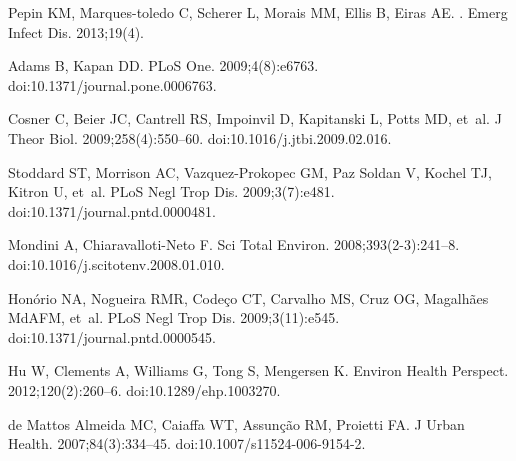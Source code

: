 \documentclass[10pt,letterpaper]{article}
\begin{document}
\begin{thebibliography}{10}
Pepin KM, Marques-toledo C, Scherer L, Morais MM, Ellis B, Eiras AE.
.
\newblock Emerg Infect Dis. 2013;19(4).

Adams B, Kapan DD.
\newblock PLoS One. 2009;4(8):e6763.
\newblock doi:{10.1371/journal.pone.0006763}.

Cosner C, Beier JC, Cantrell RS, Impoinvil D, Kapitanski L, Potts MD, et~al.
\newblock J Theor Biol. 2009;258(4):550--60.
\newblock doi:{10.1016/j.jtbi.2009.02.016}.

Stoddard ST, Morrison AC, Vazquez-Prokopec GM, {Paz Soldan} V, Kochel TJ,
  Kitron U, et~al.
\newblock PLoS Negl Trop Dis. 2009;3(7):e481.
\newblock doi:{10.1371/journal.pntd.0000481}.

Mondini A, Chiaravalloti-Neto F.
\newblock Sci Total Environ. 2008;393(2-3):241--8.
\newblock doi:{10.1016/j.scitotenv.2008.01.010}.

Hon{\'{o}}rio NA, Nogueira RMR, Code{\c{c}}o CT, Carvalho MS, Cruz OG,
  Magalh{\~{a}}es MdAFM, et~al.
\newblock PLoS Negl Trop Dis. 2009;3(11):e545.
\newblock doi:{10.1371/journal.pntd.0000545}.

Hu W, Clements A, Williams G, Tong S, Mengersen K.
\newblock Environ Health Perspect. 2012;120(2):260--6.
\newblock doi:{10.1289/ehp.1003270}.

{de Mattos Almeida} MC, Caiaffa WT, Assun{\c{c}}{\~{a}}o RM, Proietti FA.
\newblock J Urban Health. 2007;84(3):334--45.
\newblock doi:{10.1007/s11524-006-9154-2}.

\end{thebibliography}
\end{document}
